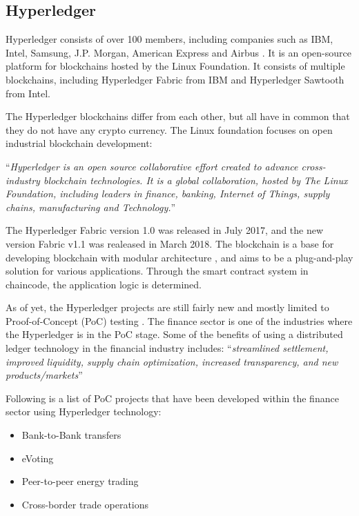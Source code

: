 \subsection{Hyperledger}
Hyperledger consists of over 100 members, including companies such as IBM, Intel, Samsung, J.P. Morgan, American Express and Airbus \cite{hyperledger}. It is an open-source platform for blockchains hosted by the Linux Foundation. It consists of multiple blockchains, including Hyperledger Fabric from IBM and Hyperledger Sawtooth from Intel. 

The Hyperledger blockchains differ from each other, but all have in common that they do not have any crypto currency. The Linux foundation focuses on open industrial blockchain development:

\enquote{\textit{Hyperledger is an open source collaborative effort created to advance cross-industry blockchain technologies. It is a global collaboration, hosted by The Linux Foundation, including leaders in finance, banking, Internet of Things, supply chains, manufacturing and Technology.}} \cite{hyperledger}

The Hyperledger Fabric version 1.0 was released in July 2017, and the new version Fabric v1.1 was realeased in March 2018. The blockchain is a base for developing blockchain with modular architecture \cite{fabric}, and aims to be a plug-and-play solution for various applications. Through the smart contract system in chaincode, the application logic is determined. 

As of yet, the Hyperledger projects are still fairly new and mostly limited to Proof-of-Concept (PoC) testing \cite{industries}. The finance sector is one of the industries where the Hyperledger is in the PoC stage. Some of the benefits of using a distributed ledger technology in the financial industry includes:
\enquote{\textit{streamlined settlement, improved liquidity, supply chain optimization, increased transparency, and new products/markets}}

Following is a list of PoC projects that have been developed within the finance sector using Hyperledger technology:

\begin{itemize}
\item Bank-to-Bank transfers \cite{bank}
\item eVoting \cite{evoting}
\item Peer-to-peer energy trading \cite{nadgrid}
\item Cross-border trade operations \cite{border}
\end{itemize}

